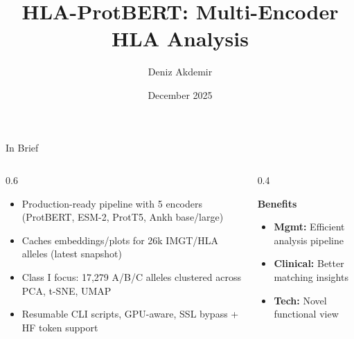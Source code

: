 \documentclass[aspectratio=169]{beamer}
\title[HLA-ProtBERT]{HLA-ProtBERT: Multi-Encoder HLA Analysis}
\author{Deniz Akdemir}
\institute{NMDP}
\date{December 2025}
\newcommand{\formanagement}[1]{\textcolor{managementcolor}{\textbf{Mgmt:} #1}}
\newcommand{\forclinical}[1]{\textcolor{clinicalcolor}{\textbf{Clinical:} #1}}
\newcommand{\forbioinformatics}[1]{\textcolor{bioinfocolor}{\textbf{Tech:} #1}}
\begin{document}
\nocite{*}

\begin{frame}
  \titlepage
\end{frame}

\begin{frame}{In Brief}
  \begin{columns}
    \begin{column}{0.6\textwidth}
      \begin{itemize}
        \item Production-ready pipeline with 5 encoders (ProtBERT, ESM-2, ProtT5, Ankh base/large)
        \item Caches embeddings/plots for 26k IMGT/HLA alleles (latest snapshot)
        \item Class I focus: 17,279 A/B/C alleles clustered across PCA, t-SNE, UMAP
        \item Resumable CLI scripts, GPU-aware, SSL bypass + HF token support
      \end{itemize}
    \end{column}
    \begin{column}{0.4\textwidth}
      \begin{tcolorbox}[colback=hlablue!5,colframe=hlablue]
      \textbf{Benefits}
      \begin{itemize}\small
        \item \formanagement{Efficient analysis pipeline}
        \item \forclinical{Better matching insights}
        \item \forbioinformatics{Novel functional view}
      \end{itemize}
      \end{tcolorbox}
    \end{column}
  \end{columns}
\end{frame}
\end{document}
